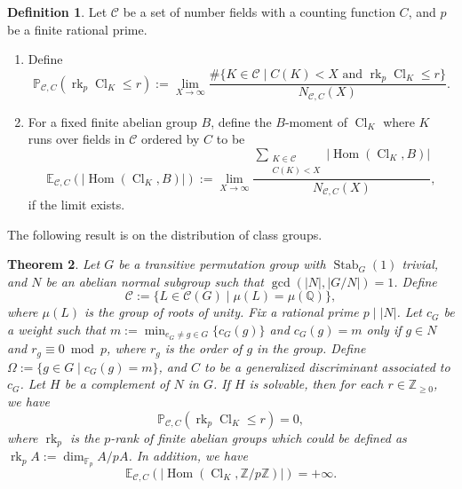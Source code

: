 \documentclass[12pt,a4paper]{amsart}
\numberwithin{equation}{section}%
\theoremstyle{plain}%
\newtheorem{theorem}{Theorem}[section]%
\theoremstyle{definition}%
\newtheorem{definition}[theorem]{Definition}%
\theoremstyle{remark}%
\begin{document}
	\begin{definition}\label{def: p-rank and moment}
		Let $\mathcal{C}$ be a set of number fields with a counting function $C$, and $p$ be a finite rational prime.
		\begin{enumerate}
			\item Define
			\begin{equation*}
				\mathbb{P}_{\mathcal{C},C}(\operatorname{rk}_p\operatorname{Cl}_K\leq r):=\lim_{X\to\infty}\frac{\#\{K\in\mathcal{C}\mid C(K)<X\text{ and }\operatorname{rk}_p\operatorname{Cl}_K\leq r\}}{N_{\mathcal{C},C}(X)}.
			\end{equation*}
			\item For a fixed finite abelian group $B$, define the $B$-moment of $\operatorname{Cl}_K$ where $K$ runs over fields in $\mathcal{C}$ ordered by $C$ to be
			\begin{equation*}
				\mathbb{E}_{\mathcal{C},C}(\lvert\operatorname{Hom}(\operatorname{Cl}_K,B)\rvert):=
				\lim_{X\to\infty}
				\frac{
					\sum_{
						\substack{
							K\in\mathcal{C}\\
							C(K)<X
							}
						}
						\lvert\operatorname{Hom}(\operatorname{Cl}_K,B)\rvert
					}{
					N_{\mathcal{C},C}(X)
					},
			\end{equation*}
			if the limit exists.
		\end{enumerate}
	\end{definition}
	The following result is on the distribution of class groups.
	\begin{theorem}\label{thm: solvable group with abelian normal subgroup S1}
		Let $G$ be a transitive permutation group with $\operatorname{Stab}_G(1)$ trivial, and $N$ be an abelian normal subgroup such that $\gcd(\lvert N\rvert,\lvert G/N\rvert)=1$.
		Define
		\begin{equation*}
			\mathcal{C}:=\{L\in\mathcal{C}(G)\mid \mu(L)=\mu(\mathbb{Q})\},
		\end{equation*}
		where $\mu(L)$ is the group of roots of unity.
		Fix a rational prime $p\mid\lvert N\rvert$.
		Let $c_{G}$ be a weight such that $\displaystyle{m:=\min_{e_{G}\neq g\in G}\{c_{G}(g)\}}$ and $c_{G}(g)=m$ only if $g\in N$ and $r_g\equiv0\bmod{p}$, where $r_g$ is the order of $g$ in the group.
		Define $\Omega:=\{g\in G\mid c_G(g)=m\}$, and $C$ to be a generalized discriminant associated to $c_{G}$.
		Let $H$ be a complement of $N$ in $G$.
		If $H$ is solvable, then for each $r\in\mathbb{Z}_{\geq0}$, we have
		\begin{equation*}
			\mathbb{P}_{\mathcal{C},C}(\operatorname{rk}_p\operatorname{Cl}_K\leq r)=0,
		\end{equation*}
		where $\operatorname{rk}_p$ is the $p$-rank of finite abelian groups which could be defined as $\operatorname{rk}_p A:=\operatorname{dim}_{\mathbb{F}_p}A/pA$.
		In addition, we have
		\begin{equation*}
			\mathbb{E}_{\mathcal{C},C}(\lvert\operatorname{Hom}(\operatorname{Cl}_K,\mathbb{Z}/p\mathbb{Z})\rvert)=+\infty.
		\end{equation*}
	\end{theorem}
\end{document}
